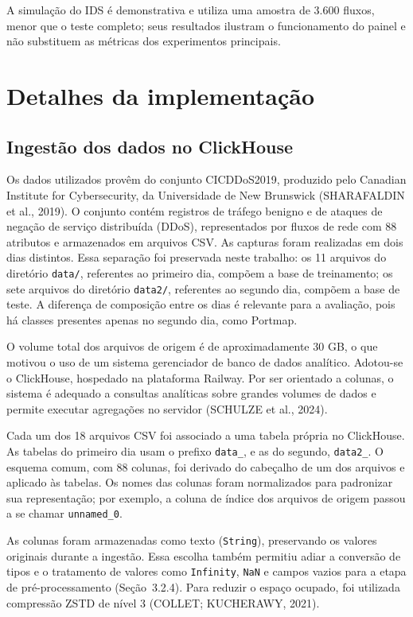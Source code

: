 \documentclass[
    12pt,                %
    openright,           %
    oneside,             %
    a4paper,             %
    english,             %
    brazil               %
]{abntex2}
\begin{document}
A simulação do IDS é demonstrativa e utiliza uma amostra de 3.600 fluxos, menor que o teste completo; seus resultados ilustram o funcionamento do painel e não substituem as métricas dos experimentos principais.

\section{Detalhes da implementação}
\label{sec:implementacao}
\subsection{Ingestão dos dados no ClickHouse}
\label{subsec:ingestao-clickhouse}

Os dados utilizados provêm do conjunto CICDDoS2019, produzido pelo Canadian Institute for Cybersecurity, da Universidade de New Brunswick (SHARAFALDIN et al., 2019). O conjunto contém registros de tráfego benigno e de ataques de negação de serviço distribuída (DDoS), representados por fluxos de rede com 88 atributos e armazenados em arquivos CSV. As capturas foram realizadas em dois dias distintos. Essa separação foi preservada neste trabalho: os 11 arquivos do diretório \texttt{data/}, referentes ao primeiro dia, compõem a base de treinamento; os sete arquivos do diretório \texttt{data2/}, referentes ao segundo dia, compõem a base de teste. A diferença de composição entre os dias é relevante para a avaliação, pois há classes presentes apenas no segundo dia, como Portmap.

O volume total dos arquivos de origem é de aproximadamente 30 GB, o que motivou o uso de um sistema gerenciador de banco de dados analítico. Adotou-se o ClickHouse, hospedado na plataforma Railway. Por ser orientado a colunas, o sistema é adequado a consultas analíticas sobre grandes volumes de dados e permite executar agregações no servidor (SCHULZE et al., 2024).

Cada um dos 18 arquivos CSV foi associado a uma tabela própria no ClickHouse. As tabelas do primeiro dia usam o prefixo \texttt{data\_}, e as do segundo, \texttt{data2\_}. O esquema comum, com 88 colunas, foi derivado do cabeçalho de um dos arquivos e aplicado às tabelas. Os nomes das colunas foram normalizados para padronizar sua representação; por exemplo, a coluna de índice dos arquivos de origem passou a se chamar \texttt{unnamed\_0}.

As colunas foram armazenadas como texto (\texttt{String}), preservando os valores originais durante a ingestão. Essa escolha também permitiu adiar a conversão de tipos e o tratamento de valores como \texttt{Infinity}, \texttt{NaN} e campos vazios para a etapa de pré-processamento (Seção~3.2.4). Para reduzir o espaço ocupado, foi utilizada compressão ZSTD de nível 3 (COLLET; KUCHERAWY, 2021).
\end{document}
